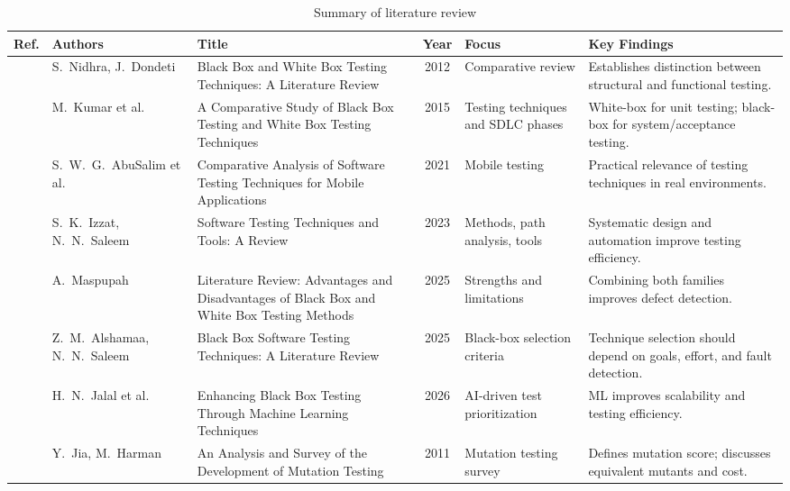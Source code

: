 \documentclass[conference]{IEEEtran}
\begin{document}
\begin{table}[!t]

\centering

\caption{Summary of literature review}

\label{tab:litreview}

\begin{tabular}{|c|L{2.4cm}|L{4.0cm}|c|L{2.8cm}|L{3.8cm}|}
\hline
\textbf{Ref.} & \textbf{Authors} & \textbf{Title} & \textbf{Year} & \textbf{Focus} & \textbf{Key Findings} \\
\hline
\cite{nidhra2012} & S.~Nidhra, J.~Dondeti & Black Box and White Box Testing Techniques: A Literature Review & 2012 & Comparative review & Establishes distinction between structural and functional testing. \\
\hline
\cite{kumar2015} & M.~Kumar et al. & A Comparative Study of Black Box Testing and White Box Testing Techniques & 2015 & Testing techniques and SDLC phases & White-box for unit testing; black-box for system/acceptance testing. \\
\hline
\cite{abuslim2021} & S.~W.~G.~AbuSalim et al. & Comparative Analysis of Software Testing Techniques for Mobile Applications & 2021 & Mobile testing & Practical relevance of testing techniques in real environments. \\
\hline
\cite{izzat2023} & S.~K.~Izzat, N.~N.~Saleem & Software Testing Techniques and Tools: A Review & 2023 & Methods, path analysis, tools & Systematic design and automation improve testing efficiency. \\
\hline
\cite{maspupah2025} & A.~Maspupah & Literature Review: Advantages and Disadvantages of Black Box and White Box Testing Methods & 2025 & Strengths and limitations & Combining both families improves defect detection. \\
\hline
\cite{alshamaa2025} & Z.~M.~Alshamaa, N.~N.~Saleem & Black Box Software Testing Techniques: A Literature Review & 2025 & Black-box selection criteria & Technique selection should depend on goals, effort, and fault detection. \\
\hline
\cite{jalal2026} & H.~N.~Jalal et al. & Enhancing Black Box Testing Through Machine Learning Techniques & 2026 & AI-driven test prioritization & ML improves scalability and testing efficiency. \\
\hline
\cite{jia2011} & Y.~Jia, M.~Harman & An Analysis and Survey of the Development of Mutation Testing & 2011 & Mutation testing survey & Defines mutation score; discusses equivalent mutants and cost. \\
\hline
\end{tabular}

\end{table}
\end{document}
